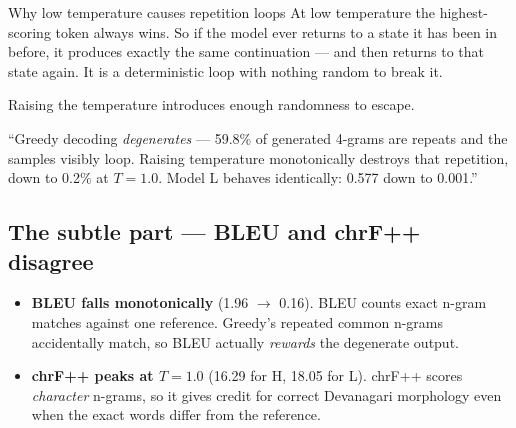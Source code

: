 \documentclass[11pt]{report}
\begin{document}
\begin{center}
\end{center}

\begin{concept}{Why low temperature causes repetition loops}
At low temperature the highest-scoring token always wins. So if the model ever
returns to a state it has been in before, it produces exactly the same
continuation --- and then returns to that state again. It is a deterministic
loop with nothing random to break it.

Raising the temperature introduces enough randomness to escape.
\end{concept}

\begin{saybox}
``Greedy decoding \emph{degenerates} --- 59.8\% of generated 4-grams are repeats
and the samples visibly loop. Raising temperature monotonically destroys that
repetition, down to 0.2\% at $T=1.0$. Model L behaves identically: 0.577 down to
0.001.''
\end{saybox}

\subsection{The subtle part --- BLEU and chrF++ disagree}

\begin{itemize}
\item \textbf{BLEU falls monotonically} (1.96 $\rightarrow$ 0.16). BLEU counts
      exact n-gram matches against one reference. Greedy's repeated common
      n-grams accidentally match, so BLEU actually \emph{rewards} the degenerate
      output.
\item \textbf{chrF++ peaks at $T = 1.0$} (16.29 for H, 18.05 for L). chrF++
      scores \emph{character} n-grams, so it gives credit for correct Devanagari
      morphology even when the exact words differ from the reference.
\end{itemize}
\end{document}
